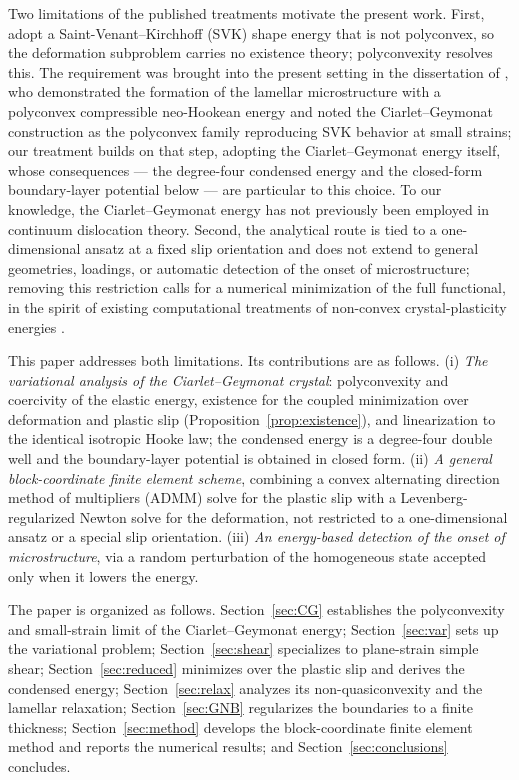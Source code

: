 \documentclass[12pt]{article}
\theoremstyle{plain}
\theoremstyle{definition}
\begin{document}
Two limitations of the published treatments motivate the present work. First, \citet{koster2015aformation,koster2015bformation} adopt a Saint-Venant--Kirchhoff (SVK) shape energy that is not polyconvex, so the deformation subproblem carries no existence theory; polyconvexity \citep{ball1976convexity} resolves this. The requirement was brought into the present setting in the dissertation of \citet{koster2018modeling}, who demonstrated the formation of the lamellar microstructure with a polyconvex compressible neo-Hookean energy and noted the Ciarlet–Geymonat construction \citep{ciarlet1982lois,ciarlet1988mathematical} as the polyconvex family reproducing SVK behavior at small strains; our treatment builds on that step, adopting the Ciarlet--Geymonat energy itself, whose consequences --- the degree-four condensed energy and the closed-form boundary-layer potential below --- are particular to this choice. To our knowledge, the Ciarlet--Geymonat energy has not previously been employed in continuum dislocation theory. Second, the analytical route is tied to a one-dimensional ansatz at a fixed slip orientation and does not extend to general geometries, loadings, or automatic detection of the onset of microstructure; removing this restriction calls for a numerical minimization of the full functional, in the spirit of existing computational treatments of non-convex crystal-plasticity energies \citep{miehe2004analysis,kochmann2011the,vidyasagar2018deformation,kumar2020assessment,arora2020dislocation,moulinec1998numerical}.

This paper addresses both limitations. Its contributions are as follows. (i) \emph{The variational analysis of the Ciarlet–Geymonat crystal}: polyconvexity and coercivity of the elastic energy, existence for the coupled minimization over deformation and plastic slip (Proposition~\ref{prop:existence}), and linearization to the identical isotropic Hooke law; the condensed energy is a degree-four double well and the boundary-layer potential is obtained in closed form. (ii) \emph{A general block-coordinate finite element scheme}, combining a convex alternating direction method of multipliers  (ADMM) solve for the plastic slip with a Levenberg-regularized Newton solve for the deformation, not restricted to a one-dimensional ansatz or a special slip orientation. (iii) \emph{An energy-based detection of the onset of microstructure}, via a random perturbation of the homogeneous state accepted only when it lowers the energy.

The paper is organized as follows. Section~\ref{sec:CG} establishes the polyconvexity and small-strain limit of the Ciarlet--Geymonat energy; Section~\ref{sec:var} sets up the variational problem;
Section~\ref{sec:shear} specializes to plane-strain simple shear;
Section~\ref{sec:reduced} minimizes over the plastic slip and derives the
condensed energy; Section~\ref{sec:relax} analyzes its non-quasiconvexity and the
lamellar relaxation; Section~\ref{sec:GNB} regularizes the boundaries to a finite
thickness; Section~\ref{sec:method} develops the block-coordinate finite element
method and reports the numerical results; and Section~\ref{sec:conclusions}
concludes.
\end{document}
